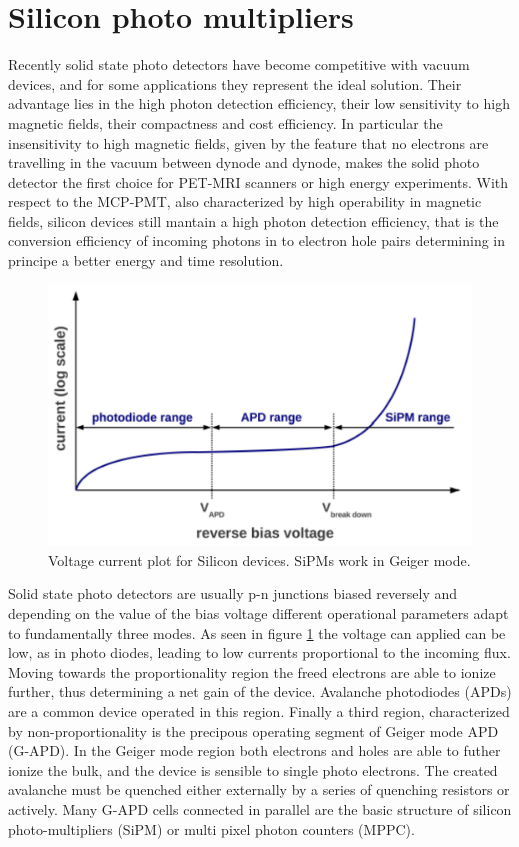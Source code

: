 \section{Silicon photo multipliers}
Recently solid state photo detectors have become competitive with vacuum devices, and for some applications they represent the ideal solution. Their advantage lies in the high photon detection efficiency, their low sensitivity to high magnetic fields, their compactness and cost efficiency\cite{Dolgoshein2003}.
In particular the insensitivity to high magnetic fields, given by the feature that no electrons are travelling in the vacuum between dynode and dynode, makes the solid photo detector the first choice for PET-MRI scanners or high energy experiments. With respect to the MCP-PMT, also characterized by high operability in magnetic fields, silicon devices still mantain a high photon detection efficiency, that is the conversion efficiency of incoming photons in to electron hole pairs determining in principe a better energy and time resolution.
\begin{figure}[htbp]
\begin{center}
\includegraphics[width=12cm]{../Pictures/Chapter_3/avalanche.pdf}
\end{center}
\caption[I-V plot Silicon detectors]{Voltage current plot for Silicon devices. SiPMs work in Geiger mode.}
\label{fig:avalanche}
\end{figure}

Solid state photo detectors are usually p-n junctions biased reversely and depending on the value of the bias voltage different operational parameters adapt to fundamentally three modes.
As seen in figure \ref{fig:avalanche} the voltage can applied can be low, as in photo diodes, leading to low currents proportional to the incoming flux. Moving towards the proportionality region the freed electrons are able to ionize further, thus determining a net gain of the device. Avalanche photodiodes (APDs) are a common device operated in this region.
Finally a third region, characterized by non-proportionality is the precipous operating segment of Geiger mode APD (G-APD). In the Geiger mode region both electrons and holes are able to futher ionize the bulk, and the device is sensible to single photo electrons. The created avalanche must be quenched either externally by a series of quenching resistors or actively.
Many G-APD cells connected in parallel are the basic structure of silicon photo-multipliers (SiPM) or multi pixel photon counters (MPPC).

